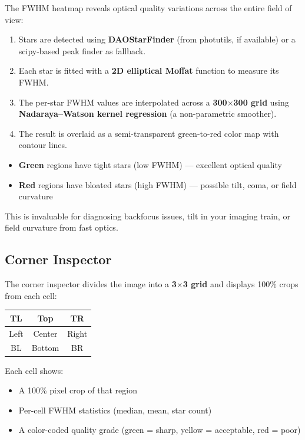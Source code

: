 \documentclass[11pt,a4paper]{article}
\begin{document}
The FWHM heatmap reveals optical quality variations across the entire field of view:

\begin{enumerate}
    \item Stars are detected using \textbf{DAOStarFinder} (from photutils, if available) or a scipy-based peak finder as fallback.
    \item Each star is fitted with a \textbf{2D elliptical Moffat} function to measure its FWHM.
    \item The per-star FWHM values are interpolated across a \textbf{300$\times$300 grid} using \textbf{Nadaraya--Watson kernel regression} (a non-parametric smoother).
    \item The result is overlaid as a semi-transparent green-to-red color map with contour lines.
\end{enumerate}

\begin{itemize}
    \item \textcolor{successgreen}{\textbf{Green}} regions have tight stars (low FWHM) --- excellent optical quality
    \item \textcolor{errorcoral}{\textbf{Red}} regions have bloated stars (high FWHM) --- possible tilt, coma, or field curvature
\end{itemize}

This is invaluable for diagnosing backfocus issues, tilt in your imaging train, or field curvature from fast optics.

\subsection{Corner Inspector}

The corner inspector divides the image into a \textbf{3$\times$3 grid} and displays 100\% crops from each cell:

\begin{center}
\begin{tabular}{|c|c|c|}
\hline
TL & Top & TR \\
\hline
Left & Center & Right \\
\hline
BL & Bottom & BR \\
\hline
\end{tabular}
\end{center}

Each cell shows:
\begin{itemize}
    \item A 100\% pixel crop of that region
    \item Per-cell FWHM statistics (median, mean, star count)
    \item A color-coded quality grade (green = sharp, yellow = acceptable, red = poor)
\end{itemize}
\end{document}
